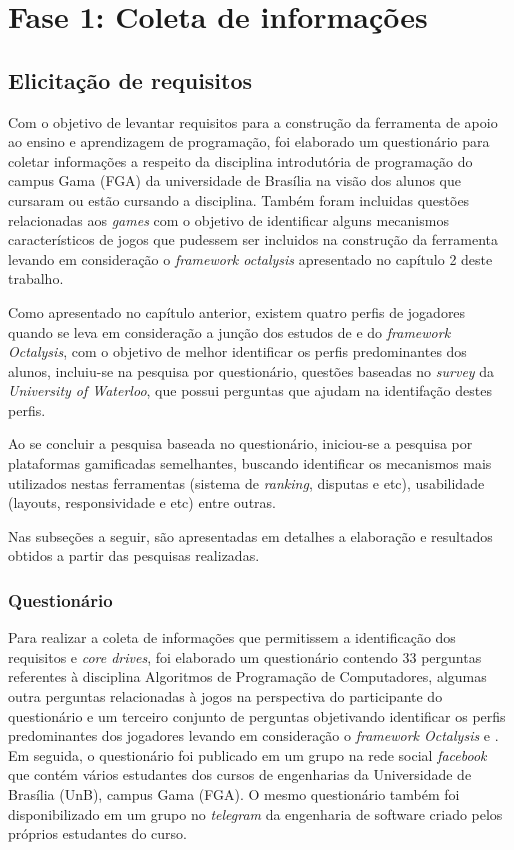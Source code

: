 \section{Fase 1: Coleta de informações }

\subsection{Elicitação de requisitos}
Com o objetivo de levantar requisitos para a construção da ferramenta de apoio ao ensino e aprendizagem de 
programação, foi elaborado um questionário para coletar informações a respeito da disciplina introdutória de programação 
do campus Gama (FGA) da universidade de Brasília na visão dos alunos que cursaram ou estão cursando a disciplina. Também 
foram incluidas  questões relacionadas aos \textit{games} com o objetivo de identificar alguns mecanismos característicos
de jogos que pudessem ser incluidos na construção da ferramenta levando em consideração o  \textit{framework octalysis}
apresentado no capítulo 2 deste trabalho.

Como apresentado no capítulo anterior, existem quatro perfis de jogadores quando se leva em consideração a junção dos estudos de  e do \textit{framework Octalysis},
com o objetivo de melhor identificar os perfis predominantes dos alunos, incluiu-se na pesquisa por questionário, questões baseadas no \textit{survey}
da \textit{University of Waterloo}, que possui perguntas que ajudam na identifação destes perfis.

Ao se concluir a pesquisa baseada no questionário, iniciou-se a pesquisa por plataformas gamificadas semelhantes, buscando
identificar os mecanismos mais utilizados nestas ferramentas (sistema de \textit{ranking}, disputas e etc), usabilidade (layouts, responsividade e etc) entre outras.

Nas subseções a seguir, são apresentadas em detalhes a elaboração e resultados obtidos a partir das pesquisas realizadas.

\subsubsection{Questionário}
Para realizar a coleta de informações que permitissem a identificação dos requisitos e \textit{core drives}, foi elaborado um questionário 
contendo 33 perguntas referentes à disciplina Algoritmos de Programação de Computadores, algumas outra perguntas
relacionadas à jogos na perspectiva do participante do questionário e um terceiro conjunto de perguntas objetivando identificar 
os perfis predominantes dos jogadores levando em consideração o \textit{framework Octalysis} e . 
Em seguida, o questionário foi publicado em um grupo na rede social \textit{facebook} que contém
vários estudantes dos cursos de engenharias da Universidade de Brasília (UnB), campus Gama (FGA). O mesmo questionário
também foi disponibilizado em um grupo no \textit{telegram} da engenharia de software criado pelos próprios estudantes do
curso. 

